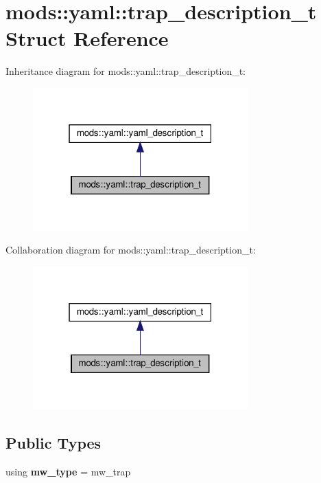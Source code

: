 \hypertarget{structmods_1_1yaml_1_1trap__description__t}{}\section{mods\+:\+:yaml\+:\+:trap\+\_\+description\+\_\+t Struct Reference}
\label{structmods_1_1yaml_1_1trap__description__t}


Inheritance diagram for mods\+:\+:yaml\+:\+:trap\+\_\+description\+\_\+t\+:\nopagebreak
\begin{figure}[H]
\begin{center}
\leavevmode
\includegraphics[width=235pt]{structmods_1_1yaml_1_1trap__description__t__inherit__graph}
\end{center}
\end{figure}


Collaboration diagram for mods\+:\+:yaml\+:\+:trap\+\_\+description\+\_\+t\+:\nopagebreak
\begin{figure}[H]
\begin{center}
\leavevmode
\includegraphics[width=235pt]{structmods_1_1yaml_1_1trap__description__t__coll__graph}
\end{center}
\end{figure}
\subsection*{Public Types}
\begin{DoxyCompactItemize}
\item 
\mbox{\label{structmods_1_1yaml_1_1trap__description__t_a45861756a52d38b6836df459a6fcc487}} 
using {\bfseries mw\+\_\+type} = mw\+\_\+trap
\end{DoxyCompactItemize}

